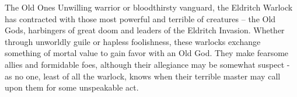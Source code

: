 \documentclass[././main.tex]{subfiles}
\begin{document}
\begin{dndclass}{The Old Ones}{
Unwilling warrior or bloodthirsty vanguard, the Eldritch Warlock has contracted with those most powerful and terrible of creatures -- the Old Gods, harbingers of great doom and leaders of the Eldritch Invasion. Whether through unworldly guile or hapless foolishness, these warlocks exchange something of mortal value to gain favor with an Old God. They make fearsome allies and formidable foes, although their allegiance may be somewhat suspect - as no one, least of all the warlock, knows when their terrible master may call upon them for some unspeakable act.}


{}
{}
{}
{}
{}
\end{dndclass}
\end{document}
